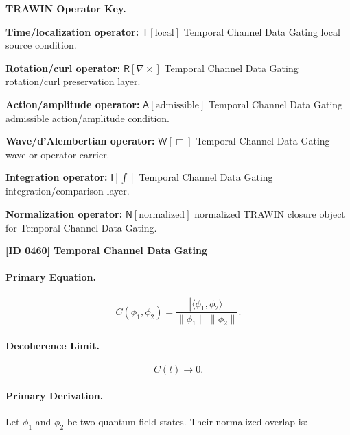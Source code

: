 \par\vspace{0.45\baselineskip}
\noindent\begin{minipage}[t]{\linewidth}
\begingroup
\small
\raggedright
\textbf{TRAWIN Operator Key.}\par
\noindent\textbf{Time/localization operator:} $\mathsf{T}\!\left[\mathrm{local}\right]$ Temporal Channel Data Gating local source condition.\par
\noindent\textbf{Rotation/curl operator:} $\mathsf{R}\!\left[\nabla\times\right]$ Temporal Channel Data Gating rotation/curl preservation layer.\par
\noindent\textbf{Action/amplitude operator:} $\mathsf{A}\!\left[\mathrm{admissible}\right]$ Temporal Channel Data Gating admissible action/amplitude condition.\par
\noindent\textbf{Wave/d'Alembertian operator:} $\mathsf{W}\!\left[\Box\right]$ Temporal Channel Data Gating wave or operator carrier.\par
\noindent\textbf{Integration operator:} $\mathsf{I}\!\left[\int\right]$ Temporal Channel Data Gating integration/comparison layer.\par
\noindent\textbf{Normalization operator:} $\mathsf{N}\!\left[\mathrm{normalized}\right]$ normalized TRAWIN closure object for Temporal Channel Data Gating.\par
\endgroup
\end{minipage}

\clearpage
\noindent\textbf{[ID 0460] Temporal Channel Data Gating}\par
\vspace{0.35em}
\paragraph{Primary Equation.}
\begin{equation}
C(\phi_1,\phi_2)
=
\frac{
|\langle \phi_1,\phi_2\rangle|
}{
\|\phi_1\|\,\|\phi_2\|
}.
\end{equation}

\paragraph{Decoherence Limit.}
\begin{equation}
C(t)\rightarrow 0 .
\end{equation}

\paragraph{Primary Derivation.}
Let $\phi_1$ and $\phi_2$ be two quantum field states.  
Their normalized overlap is:

